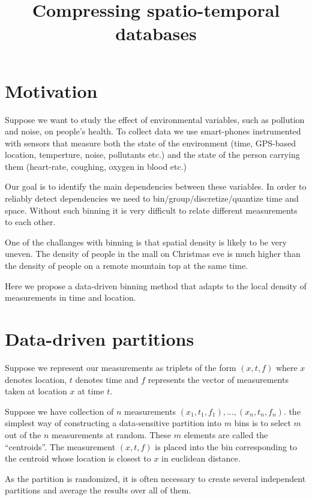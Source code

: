 \documentclass[11pt]{article}
\title{Compressing spatio-temporal databases}
\begin{document}
\maketitle

\section{Motivation}
Suppose we want to study the effect of environmental variables, such
as pollution and noise, on people's health. To collect data we use
smart-phones instrumented with sensors that measure both the state of
the environment (time, GPS-based location, temperture, noise,
pollutants etc.)  and the state of the person carrying them
(heart-rate, coughing, oxygen in blood etc.)

Our goal is to identify the main dependencies between these variables.
In order to reliably detect dependencies we need to
bin/group/discretize/quantize time and space. Without such binning it
is very difficult to relate different measurements to each other.

One of the challanges with binning is that spatial density is likely
to be very uneven. The density of people in the mall on Christmas eve
is much higher than the density of people on a remote mountain top at
the same time.

Here we propose a data-driven binning method that adapts to the
local density of measurements in time and location.

\section{Data-driven partitions} 
Suppose we represent our measurements as triplets of the form
$(x,t,f)$ where $x$ denotes location, $t$ denotes time and $f$
represents the vector of measurements taken at location $x$ at time
$t$.

Suppose we have collection of $n$ measurements
$(x_1,t_1,f_1),\ldots,(x_n,t_n,f_n)$. the simplest way of constructing
a data-sensitive partition into $m$ bins is to select $m$ out of the
$n$ measurements at random. These $m$ elements are called the
``centroids''. The measurement $(x,t,f)$ is placed into the bin
corresponding to the centroid whose location is closest to $x$ in
euclidean distance.

As the partition is randomized, it is often necessary to create
several independent partitions and average the results over all of
them.
 
\end{document}
